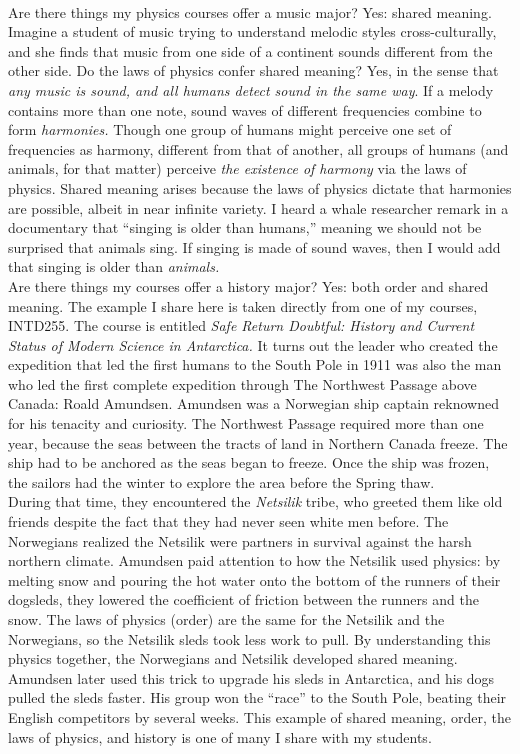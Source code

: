 \documentclass[../../../main.tex]{subfiles}
\begin{document}
\\
\vspace{0.25cm}
Are there things my physics courses offer a music major?  Yes: shared meaning.  Imagine a student of music trying to understand melodic styles cross-culturally, and she finds that music from one side of a continent sounds different from the other side.  Do the laws of physics confer shared meaning?  Yes, in the sense that \textit{any music is sound, and all humans detect sound in the same way}.  If a melody contains more than one note, sound waves of different frequencies combine to form \textit{harmonies.}  Though one group of humans might perceive one set of frequencies as harmony, different from that of another, all groups of humans (and animals, for that matter) perceive \textit{the existence of harmony} via the laws of physics.  Shared meaning arises because the laws of physics dictate that harmonies are possible, albeit in near infinite variety.  I heard a whale researcher remark in a documentary that ``singing is older than humans,'' meaning we should not be surprised that animals sing.  If singing is made of sound waves, then I would add that singing is older than \textit{animals.}
\\
\vspace{0.25cm}
Are there things my courses offer a history major?  Yes: both order and shared meaning.  The example I share here is taken directly from one of my courses, INTD255.  The course is entitled \textit{Safe Return Doubtful: History and Current Status of Modern Science in Antarctica.}  It turns out the leader who created the expedition that led the first humans to the South Pole in 1911 was also the man who led the first complete expedition through The Northwest Passage above Canada: Roald Amundsen.  Amundsen was a Norwegian ship captain reknowned for his tenacity and curiosity.  The Northwest Passage required more than one year, because the seas between the tracts of land in Northern Canada freeze.  The ship had to be anchored as the seas began to freeze.  Once the ship was frozen, the sailors had the winter to explore the area before the Spring thaw.
\\
\vspace{0.25cm}
During that time, they encountered the \textit{Netsilik} tribe, who greeted them like old friends despite the fact that they had never seen white men before.  The Norwegians realized the Netsilik were partners in survival against the harsh northern climate. Amundsen paid attention to how the Netsilik used physics: by melting snow and pouring the hot water onto the bottom of the runners of their dogsleds, they lowered the coefficient of friction between the runners and the snow.  The laws of physics (order) are the same for the Netsilik and the Norwegians, so the Netsilik sleds took less work to pull.  By understanding this physics together, the Norwegians and Netsilik developed shared meaning.  Amundsen later used this trick to upgrade his sleds in Antarctica, and his dogs pulled the sleds faster.  His group won the ``race'' to the South Pole, beating their English competitors by several weeks.  This example of shared meaning, order, the laws of physics, and history is one of many I share with my students.
\end{document}
